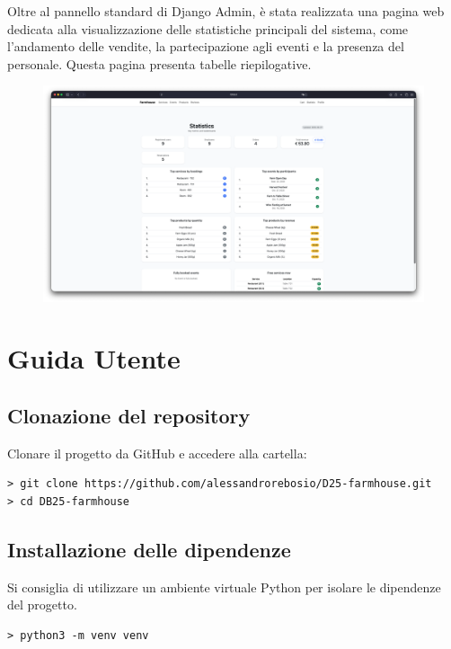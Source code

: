 \documentclass[a4paper,12pt]{report}
\begin{document}
Oltre al pannello standard di Django Admin, è stata realizzata una pagina web dedicata alla 
visualizzazione delle statistiche principali del sistema, come l'andamento delle vendite, la 
partecipazione agli eventi e la presenza del personale. Questa pagina presenta tabelle 
riepilogative.

\begin{figure}[H]
    \centering
    \includegraphics[width=\textwidth, trim=0 0 0 0]{./img/admin/statistic.png}
    \vspace{-1em}
    \label{fig:statistiche}
\end{figure}

\appendix
\chapter{Guida Utente}

\section{Clonazione del repository}
Clonare il progetto da GitHub e accedere alla cartella:

\begin{verbatim}
> git clone https://github.com/alessandrorebosio/D25-farmhouse.git
> cd DB25-farmhouse
\end{verbatim}

\section{Installazione delle dipendenze}

Si consiglia di utilizzare un ambiente virtuale Python per isolare le dipendenze del progetto.

\begin{verbatim}
> python3 -m venv venv
\end{verbatim}
\end{document}
